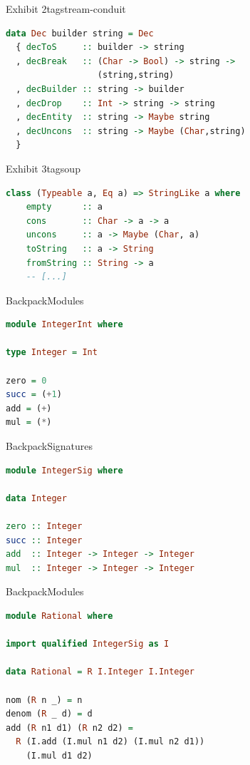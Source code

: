 \documentclass{beamer}
\begin{document}
\begin{frame}[fragile]{Exhibit 2}{tagstream-conduit}
\begin{lstlisting}[language=Haskell]
data Dec builder string = Dec
  { decToS     :: builder -> string
  , decBreak   :: (Char -> Bool) -> string ->
                  (string,string)
  , decBuilder :: string -> builder
  , decDrop    :: Int -> string -> string
  , decEntity  :: string -> Maybe string
  , decUncons  :: string -> Maybe (Char,string)
  }
\end{lstlisting}
\end{frame}

\begin{frame}[fragile]{Exhibit 3}{tagsoup}
\begin{lstlisting}[language=Haskell]
class (Typeable a, Eq a) => StringLike a where
    empty      :: a
    cons       :: Char -> a -> a
    uncons     :: a -> Maybe (Char, a)
    toString   :: a -> String
    fromString :: String -> a
    -- [...]
\end{lstlisting}
\end{frame}

\begin{frame}[fragile]{Backpack}{Modules}
\begin{lstlisting}[language=Haskell]
module IntegerInt where

type Integer = Int

zero = 0
succ = (+1)
add = (+)
mul = (*)
\end{lstlisting}
\end{frame}

\begin{frame}[fragile]{Backpack}{Signatures}
\begin{lstlisting}[language=Haskell]
module IntegerSig where

data Integer

zero :: Integer
succ :: Integer
add  :: Integer -> Integer -> Integer
mul  :: Integer -> Integer -> Integer
\end{lstlisting}
\end{frame}

\begin{frame}[fragile]{Backpack}{Modules}
\begin{lstlisting}[language=Haskell]
module Rational where

import qualified IntegerSig as I

data Rational = R I.Integer I.Integer

nom (R n _) = n
denom (R _ d) = d
add (R n1 d1) (R n2 d2) =
  R (I.add (I.mul n1 d2) (I.mul n2 d1))
    (I.mul d1 d2)
\end{lstlisting}
\end{frame}
\end{document}
